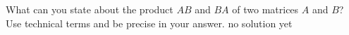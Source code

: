 {
What can you state about the product $AB$ and $BA$ of two matrices $A$ and $B$? Use technical terms and be precise  in your answer.
}
{
no solution yet
}
